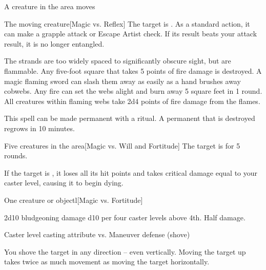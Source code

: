 \spelldur{\durshort \dismissable}
\begin{spelltrigger}{A creature in the area moves}
    \begin{spelltarget}{The moving creature}[Magic vs. Reflex]
        \spellsuccess The target is \entangled. As a standard action, it can make a grapple attack or Escape Artist check. If its result beats your attack result, it is no longer entangled.
    \end{spelltarget}
\end{spelltrigger}
\spellnotes The strands are too widely spaced to significantly obscure sight, but are flammable. Any five-foot square that takes 5 points of fire damage is destroyed. A magic flaming sword can slash them away as easily as a hand brushes away cobwebs. Any fire can set the webs alight and burn away 5 square feet in 1 round. All creatures within flaming webs take 2d4 points of fire damage from the flames.

This spell can be made permanent with a  ritual. A permanent  that is destroyed regrows in 10 minutes.

\begin{spelltarget}{Five creatures in the area}[Magic vs. Will and Fortitude]
    \spellsuccess[Will] The target is \shaken for 5 rounds.

     If the target is \bloodied, it loses all its hit points and takes critical damage equal to your caster level, causing it to begin dying.
\end{spelltarget}

\spellrng{\rngmed}
\begin{spelltarget}{One creature or object}l[Magic vs. Fortitude]
    \begin{spellmargin}
        \spellsuccess 2d10 bludgeoning damage \add d10 per four caster levels above 4th.
        \spellfailure Half damage.
    \end{spellmargin}
    \spellattack Caster level \add casting attribute vs. Maneuver defense (shove)
    \begin{spellmargin}
        \spellsuccess You shove the target in any direction -- even vertically. Moving the target up takes twice as much movement as moving the target horizontally.
    \end{spellmargin}
\end{spelltarget}

